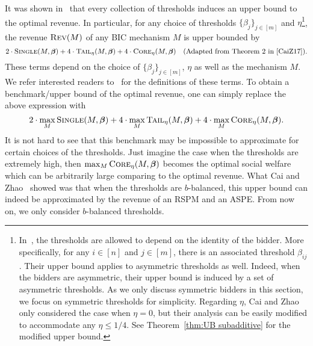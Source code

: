 It was shown in~\cite{CaiZ17} that every collection of thresholds induces an upper bound to the optimal revenue. In particular, for any choice of thresholds $\{\beta_j\}_{j\in[m]}$ and $\eta$\footnote{In~\cite{CaiZ17}, the thresholds are allowed to depend on the identity of the bidder. More specifically, for any $i\in[n]$ and $j\in[m]$, there is an associated threshold $\beta_{ij}$. Their upper bound applies to asymmetric thresholds as well. Indeed, when the bidders are asymmetric, their upper bound is induced by a set of asymmetric thresholds. As we only discuss symmetric bidders in this section, we focus on symmetric thresholds for simplicity. Regarding $\eta$, Cai and Zhao only considered the case when $\eta=0$, but their analysis can be easily modified to accommodate any $\eta\leq 1/4$. See Theorem~\ref{thm:UB subadditive} for the modified upper bound.}, the revenue $\textsc{Rev}(M)$ of any BIC mechanism $M$ is upper bounded by  $$2\cdot \textsc{Single}(M,\boldsymbol{\beta})+4\cdot \textsc{Tail}_\eta(M,\boldsymbol{\beta})+4\cdot\textsc{Core}_\eta(M,\boldsymbol{\beta})\quad\text{(Adapted from Theorem 2 in~\cite{CaiZ17})}.$$ These terms depend on the choice of $\{\beta_j\}_{j\in[m]}$, $\eta$ as well as the mechanism $M$. We refer interested readers to~\cite{CaiZ17} for the definitions of these terms. To obtain a benchmark/upper bound of the optimal revenue, one can simply replace the above expression with $$2\cdot \max_M \textsc{Single}(M,\boldsymbol{\beta})+4\cdot \max_M \textsc{Tail}_\eta(M,\boldsymbol{\beta})+4\cdot\max_M \textsc{Core}_\eta(M,\boldsymbol{\beta}).$$ {It is not hard to see that this benchmark may be impossible to approximate for certain choices of the thresholds. Just imagine the case when the thresholds are extremely high, then $\max_M \textsc{Core}_\eta(M,\boldsymbol{\beta})$ becomes the optimal social welfare which can be arbitrarily large comparing to the optimal revenue. What Cai and Zhao~\cite{CaiZ17} showed was that when the thresholds are $b$-balanced, this upper bound can indeed be approximated by the revenue of an RSPM and an ASPE. From now on, we only consider $b$-balanced thresholds.}


